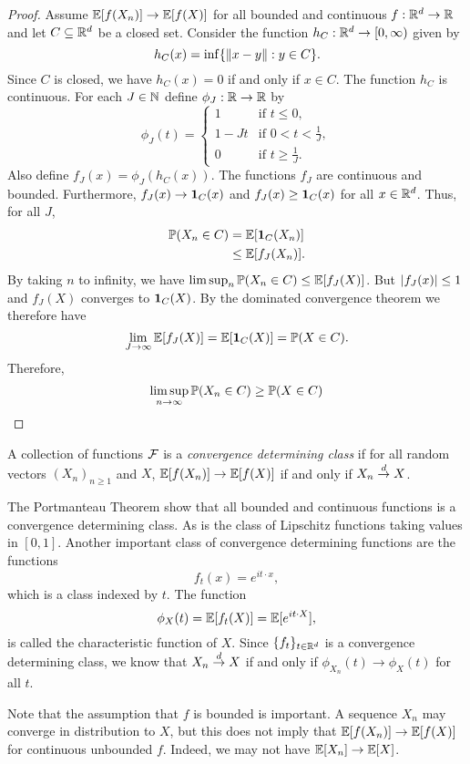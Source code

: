 \begin{proof}
    Assume ${\mathbb{E}}[f(X_n)] \to {\mathbb{E}}[f(X)]$ for all bounded and continuous $f:{\mathbb R}^d\to {\mathbb R}$ and let $C\subseteq {\mathbb R}^d$ be a closed set. Consider the function $h_C: {\mathbb R}^d \to [0,\infty)$ given by 
    \[h_C(x) = \inf\{\left\|x-y\right\|: y \in C\}.\]
    Since $C$ is closed, we have $h_C(x) = 0$ if and only if $x \in C$. The function $h_C$ is continuous. For each $J \in {{\mathbb N}}$ define $\phi_J : {\mathbb R} \to {\mathbb R}$ by 
    \[\phi_J(t) = \begin{cases}
        1 & \text{if } t \le 0,\\
        1-Jt & \text{if } 0 < t<\frac{1}{J},\\
        0 & \text{if } t \ge \frac{1}{J}.
    \end{cases} \]
    Also define $f_J(x) = \phi_J(h_C(x))$. The functions $f_J$ are continuous and bounded. Furthermore, $f_J(x)\to {{\bf 1}}_C(x)$ and $f_J(x) \ge {{\bf 1}}_C(x)$ for all $x \in {\mathbb R}^d$. Thus, for all $J$,
    \begin{align*}
        {\mathbb{P}}(X_n \in C) &= {\mathbb{E}}[{{\bf 1}}_C(X_n)]\\
        &\le {\mathbb{E}}[f_J(X_n)].
    \end{align*}
    By taking $n$ to infinity, we have $\limsup_n {\mathbb{P}}(X_n \in C) \le {\mathbb{E}}[f_J(X)]$. But ${\left\lvert f_J(x)\right\rvert} \le 1$ and $f_J(X)$ converges to ${{\bf 1}}_C(X)$. By the dominated convergence theorem we therefore have 
    \[\lim_{J \to \infty} {\mathbb{E}}[f_J(X)] = {\mathbb{E}}[{{\bf 1}}_C(X)] = {\mathbb{P}}(X \in C). \]
    Therefore,
    \[\limsup_{n \to \infty} {\mathbb{P}}(X_n \in C) \ge {\mathbb{P}}(X \in C) \qedhere \]
\end{proof}
\begin{definition}
    A collection of functions ${\mathcal{F}}$ is a \emph{convergence determining class} if for all random vectors $(X_n)_{n \ge 1}$ and $X$,  ${\mathbb{E}}[f(X_n)] \to {\mathbb{E}}[f(X)]$ if and only if $X_n \stackrel{d}{\to} X$.
\end{definition}
The Portmanteau Theorem show that all bounded and continuous functions is a convergence determining class. As is the class of Lipschitz functions taking values in $[0,1]$. Another important class of convergence determining functions are the functions 
\[f_t(x) = e^{it\cdot x}, \]
which is a class indexed by $t$. The function 
\[\phi_X(t) = {\mathbb{E}}[f_t(X)] = {\mathbb{E}}[e^{it\cdot X}], \]
is called the characteristic function of $X$. Since $\{f_t\}_{t \in {\mathbb R}^d}$ is a convergence determining class, we know that $X_n \stackrel{d}{\to} X$ if and only if $\phi_{X_n}(t) \to \phi_X(t)$ for all $t$.

Note that the assumption that $f$ is bounded is important. A sequence $X_n$ may converge in distribution to $X$, but this does not imply that ${\mathbb{E}}[f(X_n)] \to {\mathbb{E}}[f(X)]$ for continuous unbounded $f$. Indeed, we may not have ${\mathbb{E}}[X_n] \to {\mathbb{E}}[X]$. 
